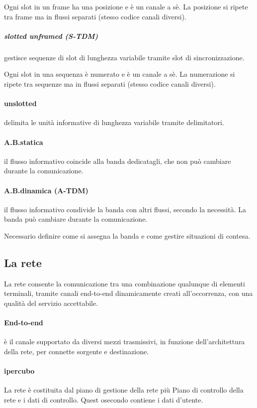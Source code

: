 Ogni slot in un frame ha una posizione e è un canale a sè. La posizione si ripete tra frame ma in flussi separati (stesso codice canali diversi).
\subparagraph{slotted unframed (S-TDM)} gestisce sequenze di slot di lunghezza variabile tramite slot di sincronizzazione.

Ogni slot in una sequenza è numerato e è un canale a sè. La numerazione si ripete tra sequenze ma in flussi separati (stesso codice canali diversi).
\paragraph{unslotted} delimita le unità informative di lunghezza variabile tramite delimitatori.
\paragraph{A.B.statica} il flusso informativo coincide alla banda  dedicatagli, che non può cambiare durante la comunicazione.
\paragraph{A.B.dinamica (A-TDM)} il flusso informativo condivide la banda con altri flussi, secondo la necessità. La banda può cambiare durante la  comunicazione.

Necessario definire come si assegna la banda e come gestire situazioni di contesa.
\subsection{La rete}
La rete consente la comunicazione tra una combinazione qualunque di elementi terminali, tramite canali end-to-end dinamicamente creati all'occorrenza, con una qualità del servizio accettabile.

\paragraph{End-to-end} è il canale supportato da diversi mezzi trasmissivi, in funzione dell'architettura della rete, per connette sorgente e destinazione.
\paragraph{ipercubo} La rete è costituita dal piano di gestione della rete più Piano di controllo della rete e i dati di controllo. Quest osecondo contiene i dati d'utente.
